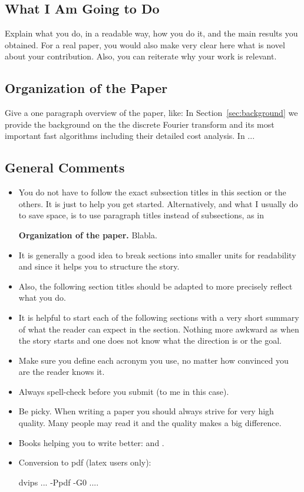 \documentclass{article}
\begin{document}
\subsection{What I Am Going to Do}

Explain what you do, in a readable way, how you do it, and the main
results you obtained. For a real paper, you would also make very clear
here what is novel about your contribution. Also, you can reiterate
why your work is relevant.

\subsection{Organization of the Paper}

Give a one paragraph overview of the paper, like: In
Section~\ref{sec:background} we provide the background on the the
discrete Fourier transform and its most important fast algorithms
including their detailed cost analysis. In ...

\subsection{General Comments}

\begin{itemize}
\item You do not have to follow the exact subsection titles in this section
or the others. It is just to help you get started.  Alternatively, and
what I usually do to save space, is to use paragraph titles instead of
subsections, as in

{\bf Organization of the paper.} Blabla.

\item It is generally a good idea to break sections into smaller units for
readability and since it helps you to structure the story.

\item Also, the following section titles should be adapted to more precisely
reflect what you do.

\item It is helpful to start each of the following sections with a very
short summary of what the reader can expect in the section. Nothing
more awkward as when the story starts and one does not know what the
direction is or the goal.

\item Make sure you define each acronym you use, no matter how convinced you are
the reader knows it.

\item Always spell-check before you submit (to me in this case).

\item Be picky. When writing a paper you should always strive for very
high quality. Many people may read it and the quality makes a big difference.

\item Books helping you to write better: \cite{Higham:98} and \cite{Strunk:00}.

\item Conversion to pdf (latex users only): 

dvips ... -Ppdf -G0 ....
\end{itemize}
\end{document}
